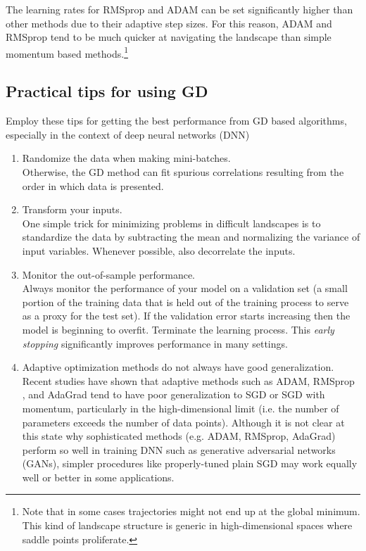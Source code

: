 The learning rates for RMSprop and ADAM can be set significantly higher than other methods due to their adaptive step sizes. For this reason, ADAM and RMSprop tend to be much quicker at navigating the landscape than simple momentum based methods.\footnote{Note that in some cases trajectories might not end up at the global minimum. This kind of landscape structure is generic in high-dimensional spaces where saddle points proliferate.}
\subsection{Practical tips for using GD}
Employ these tips for getting the best performance from GD based algorithms, especially in the context of deep neural networks (DNN)
\begin{enumerate}
	\item Randomize the data when making mini-batches.\\
	Otherwise, the GD method can fit spurious correlations resulting from the order in which data is presented.
	\item Transform your inputs.\\
	One simple trick for minimizing problems in difficult landscapes is to standardize the data by subtracting the mean and normalizing the variance of input variables. Whenever possible, also decorrelate the inputs. 
	\item Monitor the out-of-sample performance.\\
	Always monitor the performance of your model on a validation set (a small portion of the training data that is held out of the training process to serve as a proxy for the test set). If the validation error starts increasing then the model is beginning to overfit. Terminate the learning process. This \emph{early stopping} significantly improves performance in many settings.
	\item Adaptive optimization methods do not always have good generalization.\\
	Recent studies have shown that adaptive methods such as ADAM, RMSprop , and AdaGrad tend to have poor generalization to SGD or SGD with momentum, particularly in the high-dimensional limit (i.e. the number of parameters exceeds the number of data points). Although it is not clear at this state why sophisticated methods (e.g. ADAM, RMSprop, AdaGrad)  perform so well in training DNN such as generative adversarial networks (GANs), simpler procedures like properly-tuned plain SGD may work equally well or better in some applications.
\end{enumerate}







